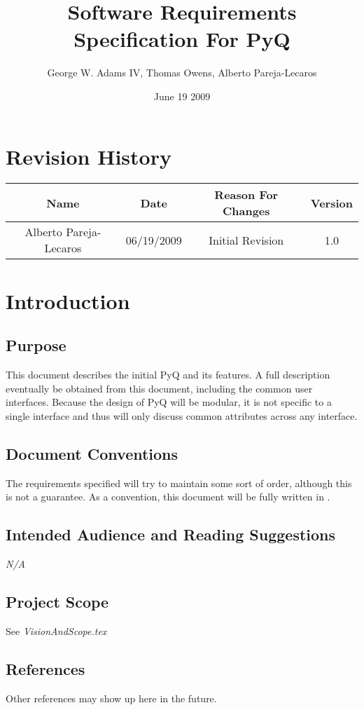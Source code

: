 \documentclass{report}
\title{Software Requirements Specification For PyQ}
\author{George W. Adams IV, Thomas Owens, Alberto Pareja-Lecaros}
\date{June 19 2009}
\begin{document}
\maketitle
\pagebreak
  \renewcommand{\thesection}{\arabic{section}}
  \renewcommand{\contentsname}{Table of Contents}
  \tableofcontents 
    \setcounter{tocdepth}{1}
  \section*{Revision History}    
  \begin{center}
    \begin{tabular}{ | c || c || c || c | }
      \hline
      \textbf{Name} & \textbf{Date} & \textbf{Reason For Changes} & \textbf{Version} \\ 
      \hline \hline
      Alberto Pareja-Lecaros & 06/19/2009 & Initial Revision & 1.0 \\ \hline
      \hline
    \end{tabular}
  \end{center}
  \section{Introduction}
  \subsection{Purpose}
   This document describes the initial PyQ and its features. A full description eventually be obtained from this document, including the common user interfaces. Because the design of PyQ will be modular, it is not specific to a single interface and thus will only discuss common attributes across any interface.
   \subsection{Document Conventions}
   The requirements specified will try to maintain some sort of order, although this is not a guarantee. As a convention, this document will be fully written in \LaTeXe.
   \subsection{Intended Audience and Reading Suggestions}
   \textit{N/A}
   \subsection{Project Scope}
   See \textit{VisionAndScope.tex}
   \subsection{References}
   Other references may show up here in the future.
\end{document}
